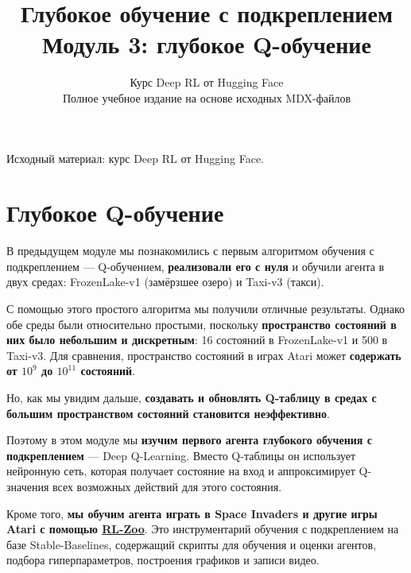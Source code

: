 \documentclass[11pt,a4paper]{article}
\title{\textbf{Глубокое обучение с подкреплением}\\[0.35em]\large Модуль 3: глубокое Q-обучение}
\author{Курс Deep RL от Hugging Face\\\small Полное учебное издание на основе исходных MDX-файлов}
\date{}
\begin{document}
\selectfont
\maketitle
\vspace{-0.8em}
\begin{center}\small\color{secondary}Исходный материал: курс Deep RL от Hugging Face.\end{center}
\tableofcontents
\vspace{1em}
\clearpage

\section{Глубокое Q-обучение}\label{deep-q-learning}


В предыдущем модуле мы познакомились с первым алгоритмом обучения с подкреплением --- Q-обучением, \textbf{реализовали его с нуля} и обучили агента в двух средах: FrozenLake-v1 (замёрзшее озеро) и Taxi-v3 (такси).

С помощью этого простого алгоритма мы получили отличные результаты. Однако обе среды были относительно простыми, поскольку \textbf{пространство состояний в них было небольшим и дискретным}: 16 состояний в FrozenLake-v1 и 500 в Taxi-v3. Для сравнения, пространство состояний в играх Atari может \textbf{содержать от \(10^{9}\) до \(10^{11}\) состояний}.

Но, как мы увидим дальше, \textbf{создавать и обновлять Q-таблицу в средах с большим пространством состояний становится неэффективно}.

Поэтому в этом модуле мы \textbf{изучим первого агента глубокого обучения с подкреплением} --- Deep Q-Learning. Вместо Q-таблицы он использует нейронную сеть, которая получает состояние на вход и аппроксимирует Q-значения всех возможных действий для этого состояния.

Кроме того, \textbf{мы обучим агента играть в Space Invaders и другие игры Atari с помощью \href{https://github.com/DLR-RM/rl-baselines3-zoo}{RL-Zoo}}. Это инструментарий обучения с подкреплением на базе Stable-Baselines, содержащий скрипты для обучения и оценки агентов, подбора гиперпараметров, построения графиков и записи видео.

\end{document}
